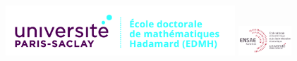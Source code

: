 \documentclass[a4paper,12pt]{book}
\begin{document}
\thispagestyle{empty}
\vspace{-2cm}
\voffset-10pt
\noindent
\hspace*{-1cm}\hbox{\includegraphics[width=8.6cm]{ed_edmh-h.jpg}} 
\hfill 
{}
\hfill
\hbox{\includegraphics[width=2cm]{logoensae-psay.jpg}}
\vspace{7mm}
\end{document}
